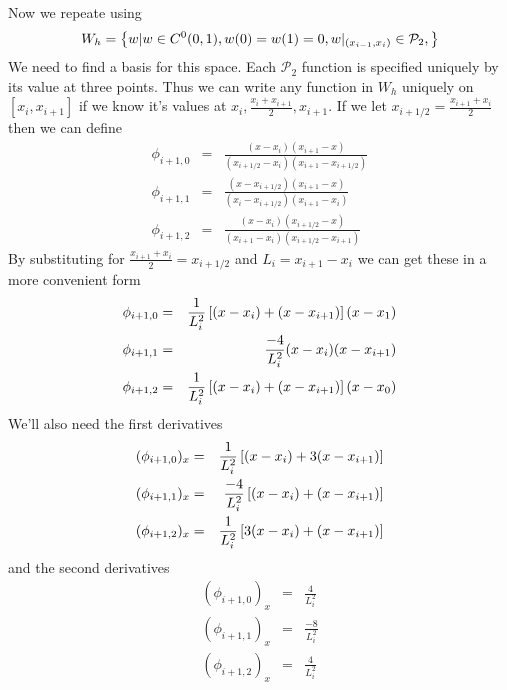 \documentclass[10pt,dvips,twoside,reqno]{amsart}
\begin{document}
Now we repeate using 
\begin{equation}
W_h = \left\{ w | w \in C^0(0,1),w(0)=w(1)=0,w|_{(x_{i-1},x_{i})} \in \mathcal{P}_2,\right\}
\end{equation}
We need to find a basis for this space. Each $\mathcal{P}_2$ function is specified uniquely by its value at three points. Thus we can write any function in $W_h$ uniquely  on $[x_{i},x_{i+1}]$ if we know it's values at $x_i,\frac{x_i + x_{i+1}}{2},x_{i+1}$. If we let $x_{i+1/2}=\frac{x_{i+1} + x_i}{2}$ then we can define
\begin{eqnarray}
\phi_{i+1,0} &=& \frac{(x - x_{i})(x_{i+1} - x)}{(x_{i+1/2} - x_{i})(x_{i+1} - x_{i+1/2})} \\
\phi_{i+1,1} &=& \frac{(x - x_{i+1/2})(x_{i+1} - x)}{(x_{i} - x_{i+1/2})(x_{i+1} - x_{i})} \\
\phi_{i+1,2} &=& \frac{(x - x_{i})(x_{i+1/2} - x)}{(x_{i+1} - x_{i})(x_{i+1/2} - x_{i+1})} 
\end{eqnarray}
By substituting for $\frac{x_{i+1} + x_i}{2}=x_{i+1/2}$ and $L_i=x_{i+1} - x_{i}$ we can get these in a more convenient form
\begin{eqnarray}
\phi_{i+1,0} &=& \frac{1}{L^2_i}\left[(x-x_i) + (x - x_{i+1}) \right](x-x_1) \\
\phi_{i+1,1} &=& \frac{-4}{L^2_i}(x-x_i)(x-x_{i+1})\\
\phi_{i+1,2} &=& \frac{1}{L^2_i}\left[(x-x_i) + (x - x_{i+1}) \right](x-x_0)
\end{eqnarray}
We'll also need the first derivatives
\begin{eqnarray}
(\phi_{i+1,0})_x &=& \frac{1}{L^2_i}\left[(x-x_i) + 3(x - x_{i+1}) \right]\\
(\phi_{i+1,1})_x &=& \frac{-4}{L^2_i} \left[(x-x_i) + (x-x_{i+1}) \right]\\
(\phi_{i+1,2})_x &=& \frac{1}{L^2_i}\left[3(x - x_{i}) + (x-x_{i+1}) \right]
\end{eqnarray}
and the second derivatives
\begin{eqnarray}
(\phi_{i+1,0})_x &=& \frac{4}{L^2_i}\\
(\phi_{i+1,1})_x &=& \frac{-8}{L^2_i}\\
(\phi_{i+1,2})_x &=& \frac{4}{L^2_i}
\end{eqnarray}
\end{document}

